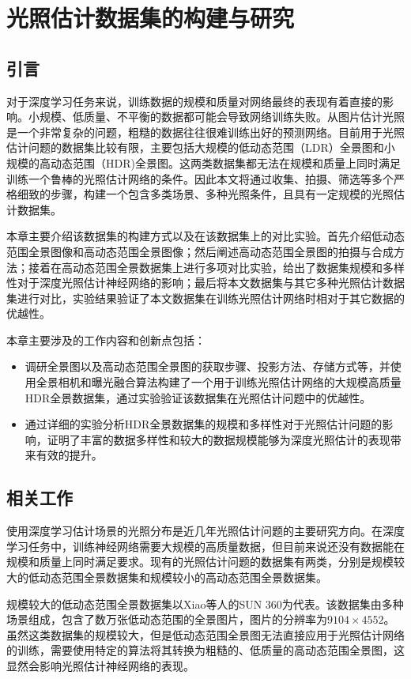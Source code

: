 \chapter{光照估计数据集的构建与研究}\label{chap:dataset}
\section{引言}
对于深度学习任务来说，训练数据的规模和质量对网络最终的表现有着直接的影响。小规模、低质量、不平衡的数据都可能会导致网络训练失败。从图片估计光照是一个非常复杂的问题，粗糙的数据往往很难训练出好的预测网络。目前用于光照估计问题的数据集比较有限，主要包括大规模的低动态范围（LDR）全景图和小规模的高动态范围（HDR)全景图。这两类数据集都无法在规模和质量上同时满足训练一个鲁棒的光照估计网络的条件。因此本文将通过收集、拍摄、筛选等多个严格细致的步骤，构建一个包含多类场景、多种光照条件，且具有一定规模的光照估计数据集。

本章主要介绍该数据集的构建方式以及在该数据集上的对比实验。首先介绍低动态范围全景图像和高动态范围全景图像；然后阐述高动态范围全景图的拍摄与合成方法；接着在高动态范围全景数据集上进行多项对比实验，给出了数据集规模和多样性对于深度光照估计神经网络的影响；最后将本文数据集与其它多种光照估计数据集进行对比，实验结果验证了本文数据集在训练光照估计网络时相对于其它数据的优越性。

本章主要涉及的工作内容和创新点包括：
\begin{itemize}
    \item 调研全景图以及高动态范围全景图的获取步骤、投影方法、存储方式等，并使用全景相机和曝光融合算法构建了一个用于训练光照估计网络的大规模高质量HDR全景数据集，通过实验验证该数据集在光照估计问题中的优越性。
    \item 通过详细的实验分析HDR全景数据集的规模和多样性对于光照估计问题的影响，证明了丰富的数据多样性和较大的数据规模能够为深度光照估计的表现带来有效的提升。
\end{itemize}
\section{相关工作}
使用深度学习估计场景的光照分布是近几年光照估计问题的主要研究方向。在深度学习任务中，训练神经网络需要大规模的高质量数据，但目前来说还没有数据能在规模和质量上同时满足要求。现有的光照估计问题的数据集有两类，分别是规模较大的低动态范围全景数据集和规模较小的高动态范围全景数据集。

规模较大的低动态范围全景数据集以Xiao等人的SUN 360\cite{xiao2012recognizing}为代表。该数据集由多种场景组成，包含了数万张低动态范围的全景图片，图片的分辨率为$9104\times4552$。虽然这类数据集的规模较大，但是低动态范围全景图无法直接应用于光照估计网络的训练，需要使用特定的算法将其转换为粗糙的、低质量的高动态范围全景图，这显然会影响光照估计神经网络的表现。

